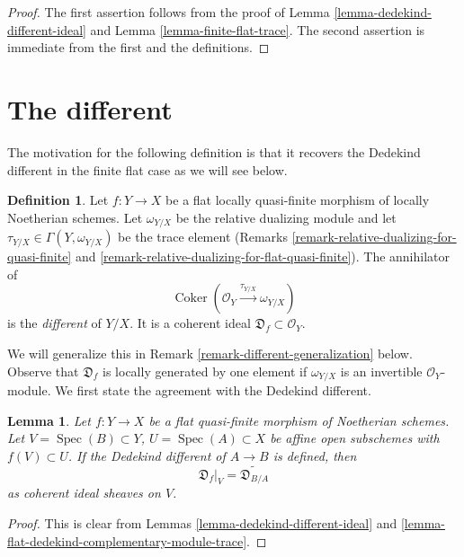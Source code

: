 \documentclass{stacks-project}
\theoremstyle{plain}
\newtheorem{lemma}[subsection]{Lemma}
\theoremstyle{definition}
\newtheorem{definition}[subsection]{Definition}
\theoremstyle{remark}
\numberwithin{equation}{subsection}
\def\Spec{\mathop{\mathrm{Spec}}}
\def\Coker{\mathop{\mathrm{Coker}}}
\begin{document}
\begin{proof}
The first assertion
follows from the proof of Lemma \ref{lemma-dedekind-different-ideal}
and Lemma \ref{lemma-finite-flat-trace}.
The second assertion is immediate from the first and the
definitions.
\end{proof}



\section{The different}
\label{section-different}

\noindent
The motivation for the following definition is that it recovers the
Dedekind different in the finite flat case as we will see below.

\begin{definition}
\label{definition-different}
Let $f : Y \to X$ be a flat locally quasi-finite morphism of
locally Noetherian schemes.
Let $\omega_{Y/X}$ be the relative dualizing module and let
$\tau_{Y/X} \in \Gamma(Y, \omega_{Y/X})$ be the trace element
(Remarks \ref{remark-relative-dualizing-for-quasi-finite} and
\ref{remark-relative-dualizing-for-flat-quasi-finite}).
The annihilator of
$$
\Coker(\mathcal{O}_Y \xrightarrow{\tau_{Y/X}} \omega_{Y/X})
$$
is the {\it different} of $Y/X$. It is a coherent ideal
$\mathfrak{D}_f \subset \mathcal{O}_Y$.
\end{definition}

\noindent
We will generalize this in Remark \ref{remark-different-generalization} below.
Observe that $\mathfrak{D}_f$ is locally generated by one element if
$\omega_{Y/X}$ is an invertible $\mathcal{O}_Y$-module.
We first state the agreement with the Dedekind different.

\begin{lemma}
\label{lemma-flat-agree-dedekind}
Let $f : Y \to X$ be a flat quasi-finite morphism of Noetherian schemes.
Let $V = \Spec(B) \subset Y$, $U = \Spec(A) \subset X$
be affine open subschemes with $f(V) \subset U$.
If the Dedekind different of $A \to B$ is defined, then
$$
\mathfrak{D}_f|_V = \widetilde{\mathfrak{D}_{B/A}}
$$
as coherent ideal sheaves on $V$.
\end{lemma}

\begin{proof}
This is clear from Lemmas \ref{lemma-dedekind-different-ideal} and
\ref{lemma-flat-dedekind-complementary-module-trace}.
\end{proof}
\end{document}
